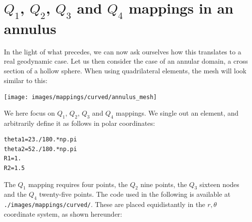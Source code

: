\newpage
\section{$Q_1$, $Q_2$, $Q_3$ and $Q_4$ mappings in an annulus }

In the light of what precedes, we can now ask ourselves how this translates to 
a real geodynamic case. Let us then consider the case of an annular domain, 
a cross section of a hollow sphere. 
When using quadrilateral elements, the mesh will look similar to this:

\begin{center}
\texttt{[image: images/mappings/curved/annulus\_mesh]}
\end{center}

We here focus on $Q_1$, $Q_2$, $Q_3$ and $Q_4$ mappings. We single out an element, 
and arbitrarily define it as follows in polar coordinates:
\begin{lstlisting}
theta1=23./180.*np.pi
theta2=52./180.*np.pi
R1=1.
R2=1.5
\end{lstlisting}
The $Q_1$ mapping requires four points, the $Q_2$ nine points,
the $Q_3$ sixteen nodes and the $Q_4$ twenty-five points. 
The code used in the following is available at {\tt ./images/mappings/curved/}.
These are placed equidistantly in the $r,\theta$ coordinate
system, as shown hereunder:

